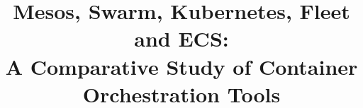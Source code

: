 \documentclass[conference]{IEEEtran}
\begin{document}


\title{Mesos, Swarm, Kubernetes, Fleet and ECS: \\
A Comparative Study of Container Orchestration Tools}
 \author{
}


\maketitle




\IEEEpeerreviewmaketitle





























\end{document}
